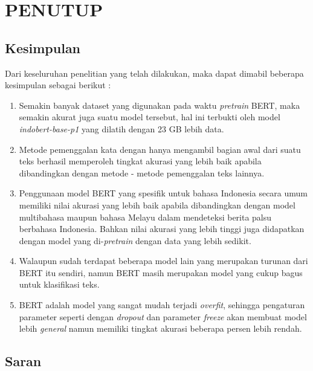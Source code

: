 \chapter{PENUTUP}
\label{chap:penutup}


\section{Kesimpulan}
\label{sec:kesimpulan}

Dari keseluruhan penelitian yang telah dilakukan, maka dapat dimabil beberapa kesimpulan sebagai berikut :

\begin{enumerate}[nolistsep]

  \item Semakin banyak dataset yang digunakan pada waktu \textit{pretrain} BERT, maka semakin akurat juga suatu model tersebut, hal ini terbukti oleh model \textit{indobert-base-p1} yang dilatih dengan 23 GB lebih data.
  \item Metode pemenggalan kata dengan hanya mengambil bagian awal dari suatu teks berhasil memperoleh tingkat akurasi yang lebih baik apabila dibandingkan dengan metode - metode pemenggalan teks lainnya.
  \item Penggunaan model BERT yang spesifik untuk bahasa Indonesia secara umum memiliki nilai akurasi yang lebih baik apabila dibandingkan dengan model multibahasa maupun bahasa Melayu dalam mendeteksi berita palsu berbahasa Indonesia. Bahkan nilai akurasi yang lebih tinggi juga didapatkan dengan model yang di-\textit{pretrain} dengan data yang lebih sedikit.
  \item Walaupun sudah terdapat beberapa model lain yang merupakan turunan dari BERT itu sendiri, namun BERT masih merupakan model yang cukup bagus untuk klasifikasi teks.
  \item BERT adalah model yang sangat mudah terjadi \textit{overfit}, sehingga pengaturan parameter seperti dengan \textit{dropout} dan parameter \textit{freeze} akan membuat model lebih \textit{general} namun memiliki tingkat akurasi beberapa persen lebih rendah.

\end{enumerate}

\section{Saran}
\label{chap:saran}

